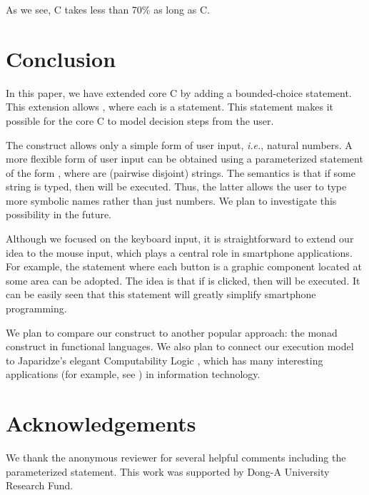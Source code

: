 \documentclass[letter]{ieice}
\newcommand{\ie}{{\em i.e.}}
\newcommand{\muprolog}{{C}}
\begin{document}
As we see, \muprolog  
takes less than 70\% as long as C.


\section{Conclusion}\label{sec:conc}

In this paper, we have  extended  core C  by adding a bounded-choice statement.
 This extension allows   ,  where each  is a statement.
This statement makes it possible for the core C
to model decision steps from the user. 

 The  construct allows only a simple form of user input, \ie,   natural numbers.
A more flexible form of user input can be obtained using a parameterized  statement
of the form , where  are (pairwise disjoint) strings.
The semantics is that if some string  is typed, then  will be executed.
Thus, the latter allows   the user to type  more symbolic names rather than  just  numbers.
We plan to investigate this possibility in the future.

Although we focused on the keyboard input, it is straightforward to extend our idea
to the mouse input, which plays a central role in smartphone applications.
For example, the statement  where
each button is a graphic component located at some area can be adopted. The idea is that if  is clicked,
then  will be executed. It can be easily seen 
 that this statement will greatly
 simplify  smartphone
programming.





We plan to compare our construct to another popular approach: the monad construct 
in functional languages. We also plan to
connect our execution model to Japaridze's elegant 
Computability Logic \cite{Jap03,Jap08},
which has many interesting applications (for example, see \cite{KHP13})
 in information technology. 

\section{Acknowledgements}

We thank the anonymous reviewer for several helpful comments including the parameterized  statement.
This work  was supported by Dong-A University Research Fund.
\end{document}
